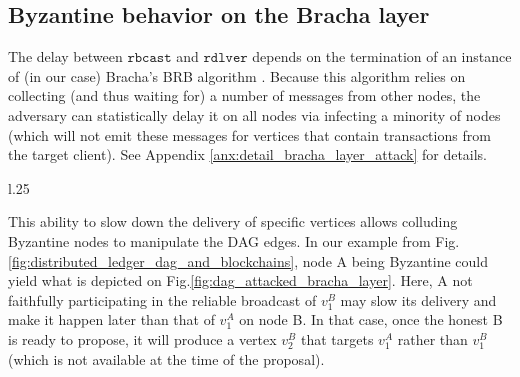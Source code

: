 

\subsection{Byzantine behavior on the Bracha layer\label{ssec:attack_bracha}}


The delay between $\mathtt{rbcast}$ and $\mathtt{rdlver}$ depends on the termination of an instance of (in our case) Bracha's BRB algorithm \cite{on_the_versatility_of_bracha_byzantine_reliable_broadcast_algorithm}.
Because this algorithm relies on collecting (and thus waiting for) a number of messages from other nodes, the adversary can statistically delay it on all nodes via infecting a minority of nodes (which will not emit these messages for vertices that contain transactions from the target client).
See Appendix \ref{anx:detail_bracha_layer_attack} for details.



\begin{wrapfigure}{l}{.25\textwidth}
\vspace*{-.3cm}
    \centering
    \scalebox{.75}{}
    \caption{Bracha layer attack}
    \label{fig:dag_attacked_bracha_layer}
\vspace*{-.4cm}
\end{wrapfigure}


This ability to slow down the delivery of specific vertices allows colluding Byzantine nodes to manipulate the DAG edges.
In our example from Fig.\ref{fig:distributed_ledger_dag_and_blockchains}, node A being Byzantine could yield what is depicted on Fig.\ref{fig:dag_attacked_bracha_layer}.
Here, A not faithfully participating in the reliable broadcast of $v_1^B$ may slow its delivery and make it happen later than that of $v_1^A$ on node B.
In that case, once the honest B is ready to propose, it will produce a vertex $v_2^B$ that targets $v_1^A$ rather than $v_1^B$ (which is not available at the time of the proposal).




